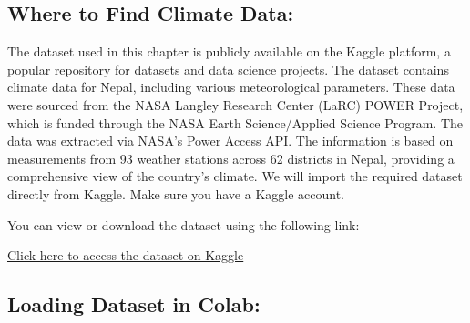 \subsection*{Where to Find Climate Data:}

The dataset used in this chapter is publicly available on the Kaggle platform, a popular repository for datasets and data science projects. The dataset contains climate data for Nepal, including various meteorological parameters. These data were sourced from the NASA Langley Research Center (LaRC) POWER Project, which is funded through the NASA Earth Science/Applied Science Program. The data was extracted via NASA’s Power Access API. The information is based on measurements from 93 weather stations across 62 districts in Nepal, providing a comprehensive view of the country’s climate. We will import the required dataset directly from Kaggle. Make sure you have a Kaggle account.

You can view or download the dataset using the following link:

\medskip

\href{https://www.kaggle.com/code/saimondahal/nepal-climate-data-eda-insights/input}{Click here to access the dataset on Kaggle
}
\medskip

\subsection*{Loading Dataset in Colab:}

